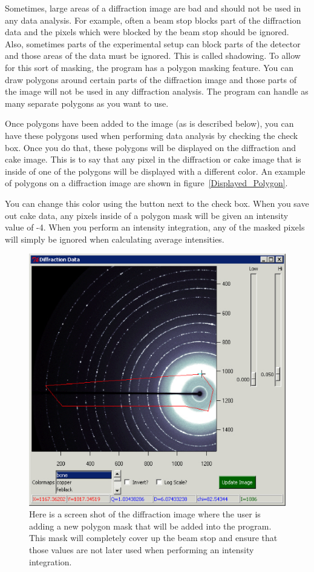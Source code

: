 Sometimes, large areas of a diffraction image are bad 
and should not be used in any data analysis. For example, 
often a beam stop blocks part of the diffraction data 
and the pixels which were blocked by the beam stop 
should be ignored. Also, sometimes parts of the experimental 
setup can block parts of the detector and those areas 
of the data must be ignored. This is called shadowing.
To allow for this sort of masking, the program has a 
polygon masking feature. You can draw polygons around 
certain parts of the diffraction image and those parts 
of the image will not be used in any diffraction analysis. 
The program can handle as many separate polygons as you 
want to use.

Once polygons have been added to the image (as is 
described below), you can have these polygons
used when performing data analysis by checking the
 check box. Once you do that,
these polygons will be displayed on the diffraction
and cake image. This is to say that any pixel in
the diffraction or cake image that is inside of one of
the polygons will be displayed with a different color.
An example of polygons on a diffraction image are 
shown in figure~\ref{Displayed_Polygon}.

You can change this color using the  button
next to the  check box.
When you save out cake data, any pixels inside of 
a polygon mask will be given an intensity 
value of -4. When you perform an intensity integration,
any of the masked pixels will simply be ignored when
calculating average intensities.

\begin{figure}
\centering
\includegraphics[scale=.75]{figures/Adding_Polygon.eps}
\caption{Here is a screen shot of the diffraction
image where the user is adding a new polygon 
mask that will be added into the program.
This mask will completely cover up the beam stop
and ensure that those values are not later used
when performing an intensity integration.}
\label{Adding_Polygon}
\end{figure}

